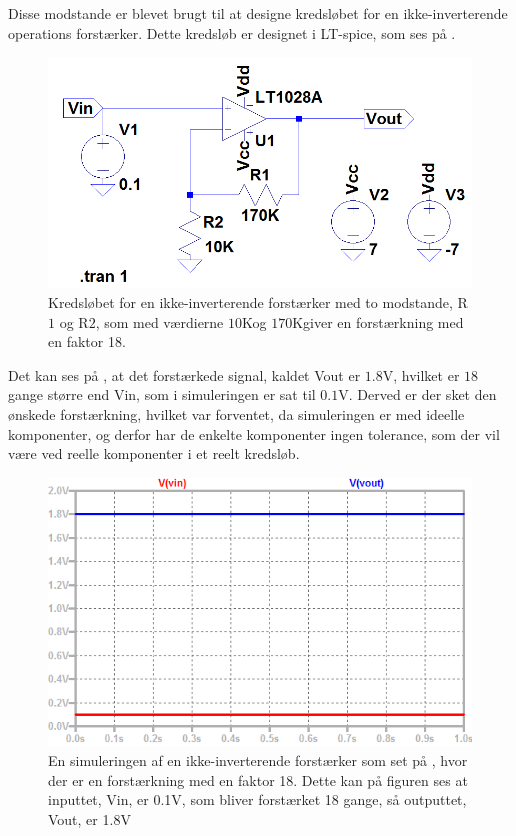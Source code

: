 Disse modstande er blevet brugt til at designe kredsløbet for en ikke-inverterende operations forstærker. Dette kredsløb er designet i LT-spice, som ses på . 
\begin{figure}[H]
\centering
\includegraphics[scale=1]{figures/cProblemloesning/Forstaerker_faktor18.PNG}
\caption{Kredsløbet for en ikke-inverterende forstærker med to modstande, R$1$ og R$2$, som med værdierne $10$K\Omega og $170$K\Omaga giver en forstærkning med en faktor 18.}
\label{fig:Forstaerker_faktor18}
\end{figure} 

Det kan ses på , at det forstærkede signal, kaldet Vout er $1.8$V, hvilket er $18$ gange større end Vin, som i simuleringen er sat til $0.1$V. Derved er der sket den ønskede forstærkning, hvilket var forventet, da simuleringen er med ideelle komponenter, og derfor har de enkelte komponenter ingen tolerance, som der vil være ved reelle komponenter i et reelt kredsløb. 

\begin{figure}[H]
\centering
\includegraphics[scale=1]{figures/cProblemloesning/Forstaerker_faktor18_simulering.PNG}
\caption{En simuleringen af en ikke-inverterende forstærker som set på , hvor der er en forstærkning med en faktor 18. Dette kan på figuren ses at inputtet, Vin, er 0.1V, som bliver forstærket 18 gange, så outputtet, Vout, er 1.8V}
\label{fig:Forstaerker_faktor18_simulering}
\end{figure} 